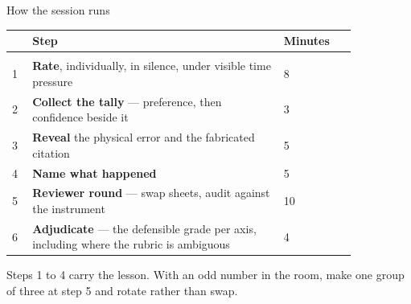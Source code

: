\documentclass[aspectratio=169,11pt]{beamer}
\begin{document}
\begin{frame}{How the session runs}
  \vspace{1mm}
  {\small
  \begin{tabular}{p{0.05\linewidth} p{0.62\linewidth} p{0.18\linewidth}}
    & \textbf{Step} & \textbf{Minutes} \\[0.3em]
    \hline \\[-0.6em]
    1 & \textbf{Rate}, individually, in silence, under visible time pressure & 8 \\[0.35em]
    2 & \textbf{Collect the tally} --- preference, then confidence beside it & 3 \\[0.35em]
    3 & \textbf{Reveal} the physical error and the fabricated citation & 5 \\[0.35em]
    4 & \textbf{Name what happened} & 5 \\[0.35em]
    5 & \textbf{Reviewer round} --- swap sheets, audit against the instrument & 10 \\[0.35em]
    6 & \textbf{Adjudicate} --- the defensible grade per axis, including where the rubric is ambiguous & 4 \\
  \end{tabular}}
  \vspace{2mm}

  {\scriptsize Steps 1 to 4 carry the lesson. With an odd number in the room, make one group of
   three at step 5 and rotate rather than swap.}
\end{frame}
\end{document}
